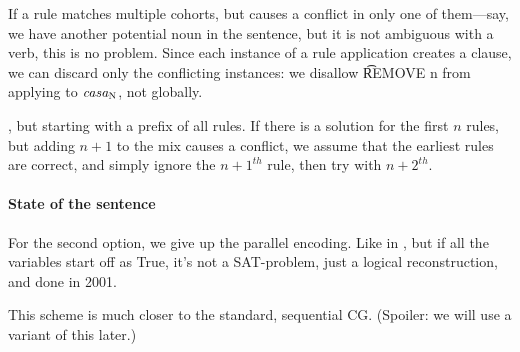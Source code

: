 If a rule matches multiple cohorts, but causes a conflict in only one of them---say, we have another potential noun in the sentence, but it is not ambiguous with a verb, this is no problem. Since each instance of a rule application creates a clause, we can discard only the conflicting instances: we disallow \t{REMOVE n} from applying to $\text{\em casa}_{\text{\sc N}}$, not globally.


, but starting with a prefix of all rules.
If there is a solution for the first $n$ rules, but adding $n+1$ to the mix causes a conflict, we assume that the earliest rules are correct, and simply ignore the $n+1^{th}$ rule, then try with $n+2^{th}$.



\paragraph{State of the sentence} For the second option, we give up the parallel encoding. Like in \cite{lager_nivre01}, but if all the variables start off as True, it's not a SAT-problem, just a logical reconstruction, and done in 2001.

This scheme is much closer to the standard, sequential CG.
(Spoiler: we will use a variant of this later.)






